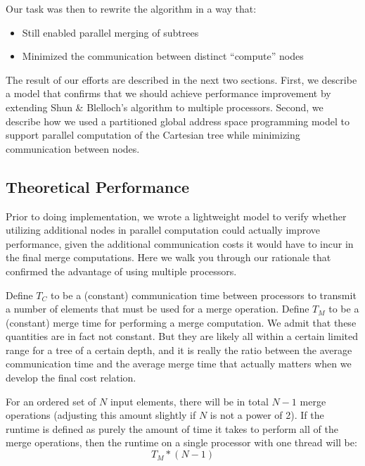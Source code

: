 \documentclass[10pt]{article}
\begin{document}
Our task was then to rewrite the algorithm in a way that:
\begin{itemize}[noitemsep]
  \item Still enabled parallel merging of subtrees
  \item Minimized the communication between distinct ``compute'' nodes
\end{itemize}
The result of our efforts are described in the next two sections.
First, we describe a model that confirms that we should achieve performance improvement by
extending Shun \& Blelloch's algorithm to multiple processors.
Second, we describe how we used a partitioned global address space programming model to support parallel
computation of the Cartesian tree while minimizing communication between nodes.

\subsection{Theoretical Performance}

Prior to doing implementation, we wrote a lightweight model to verify whether utilizing additional
nodes in parallel computation could actually improve performance, given the additional
communication costs it would have to incur in the final merge computations.
Here we walk you through our rationale that confirmed the advantage of using multiple processors.

Define $T_C$ to be a (constant) communication time between processors to transmit a number of
elements that must be used for a merge operation.
Define $T_M$ to be a (constant) merge time for performing a merge computation.
We admit that these quantities are in fact not constant.
But they are likely all within a certain limited range for a tree of a certain depth, and it is
really the ratio between the average communication time and the average merge time that actually
matters when we develop the final cost relation.

For an ordered set of $N$ input elements, there will be in total $N - 1$ merge operations (adjusting
this amount slightly if $N$ is not a power of 2).
If the runtime is defined as purely the amount of time it takes to perform all of the merge
operations, then the runtime on a single processor with one thread will be:
\begin{equation}\label{eqn:single}
T_M * (N-1)
\end{equation}
\end{document}
